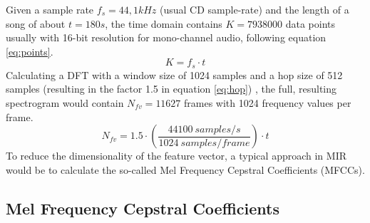 Given a sample rate $f_s = 44,1kHz$ (usual CD sample-rate) and the length of a song of about $t = 180s$, the time domain contains $K = 7938000$ data points usually with 16-bit resolution for mono-channel audio, following equation \eqref{eq:points}. 
\begin{equation} \label{eq:points}
K = f_s \cdot t
\end{equation}
Calculating a DFT with a window size of 1024 samples and a hop size of 512 samples (resulting in the factor 1.5 in equation \eqref{eq:hop}) \cite[p. 41]{knees1}, the full, resulting spectrogram would contain $N_{fv} = 11627$ frames with 1024 frequency values per frame.
\begin{equation} \label{eq:hop}
N_{fv} = 1.5 \cdot (\frac{44100 \ samples/s}{1024 \ samples/frame}) \cdot t
\end{equation}
To reduce the dimensionality of the feature vector, a typical approach in MIR would be to calculate the so-called Mel Frequency Cepstral Coefficients (MFCCs).

\subsection{Mel Frequency Cepstral Coefficients}\label{mfccsim}

